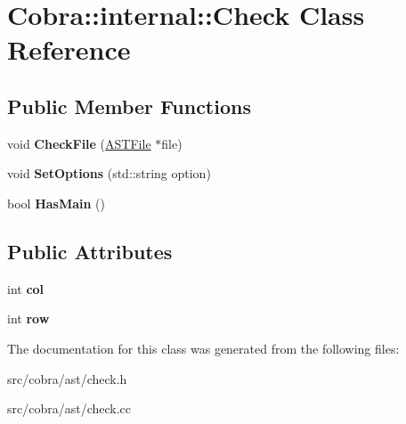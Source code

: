 \hypertarget{class_cobra_1_1internal_1_1_check}{\section{Cobra\+:\+:internal\+:\+:Check Class Reference}
\label{class_cobra_1_1internal_1_1_check}
}
\subsection*{Public Member Functions}
\begin{DoxyCompactItemize}
\item 
\hypertarget{class_cobra_1_1internal_1_1_check_aceadf25dcbd139918ddcc751dddadaed}{void {\bfseries Check\+File} (\hyperlink{class_cobra_1_1internal_1_1_a_s_t_file}{A\+S\+T\+File} $\ast$file)}\label{class_cobra_1_1internal_1_1_check_aceadf25dcbd139918ddcc751dddadaed}

\item 
\hypertarget{class_cobra_1_1internal_1_1_check_a5b9360505f85697d3a4b06f371255c9d}{void {\bfseries Set\+Options} (std\+::string option)}\label{class_cobra_1_1internal_1_1_check_a5b9360505f85697d3a4b06f371255c9d}

\item 
\hypertarget{class_cobra_1_1internal_1_1_check_a0221d7a96e1581a4e9c9f097c0cb75b7}{bool {\bfseries Has\+Main} ()}\label{class_cobra_1_1internal_1_1_check_a0221d7a96e1581a4e9c9f097c0cb75b7}

\end{DoxyCompactItemize}
\subsection*{Public Attributes}
\begin{DoxyCompactItemize}
\item 
\hypertarget{class_cobra_1_1internal_1_1_check_a5ac845f4fe07186c2b175c5021cf3205}{int {\bfseries col}}\label{class_cobra_1_1internal_1_1_check_a5ac845f4fe07186c2b175c5021cf3205}

\item 
\hypertarget{class_cobra_1_1internal_1_1_check_aa5dab76efd3b801cd18d56b0806ca020}{int {\bfseries row}}\label{class_cobra_1_1internal_1_1_check_aa5dab76efd3b801cd18d56b0806ca020}

\end{DoxyCompactItemize}


The documentation for this class was generated from the following files\+:\begin{DoxyCompactItemize}
\item 
src/cobra/ast/check.\+h\item 
src/cobra/ast/check.\+cc\end{DoxyCompactItemize}
